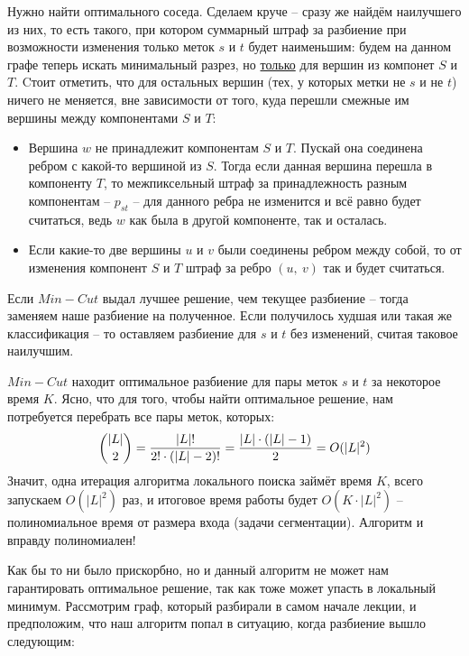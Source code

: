 \documentclass[a4paper,12pt]{article}
\begin{document}
Нужно найти оптимального соседа. Сделаем круче -- сразу же найдём наилучшего из них, то есть такого, при котором суммарный штраф за разбиение при возможности изменения только меток $s$ и $t$ будет наименьшим: будем на данном графе теперь искать минимальный разрез, но \underline{только} для вершин из компонет $S$ и $T$. Cтоит отметить, что для остальных вершин (тех, у которых метки не $s$ и не $t$) ничего не меняется, вне зависимости от того, куда перешли смежные им вершины между компонентами $S$ и $T$:
\begin{itemize}
    \item Вершина $w$ не принадлежит компонентам $S$ и $T$. Пускай она соединена ребром с какой-то вершиной из $S$. Тогда если данная вершина перешла в компоненту $T$, то межпиксельный штраф за принадлежность разным компонентам -- $p_{st}$ -- для данного ребра не изменится и всё равно будет считаться, ведь $w$ как была в другой компоненте, так и осталась.
    \item Если какие-то две вершины $u$ и $v$ были соединены ребром между собой, то от изменения компонент $S$ и $T$ штраф за ребро $(u,\ v)$ так и будет считаться.
\end{itemize}
Если $Min-Cut$ выдал лучшее решение, чем текущее разбиение -- тогда заменяем наше разбиение на полученное. Если получилось худшая или такая же классификация -- то оставляем разбиение для $s$ и $t$ без изменений, считая таковое наилучшим.

$Min-Cut$ находит оптимальное разбиение для пары меток $s$ и $t$ за некоторое время $K$. Ясно, что для того, чтобы найти оптимальное решение, нам потребуется перебрать все пары меток, которых:
\[\dbinom {|L|}{2} = \frac{|L|!}{2!\cdot (|L|-2)!} = \frac{|L| \cdot (|L| - 1)}{2} = O(|L|^2)\]
Значит, одна итерация алгоритма локального поиска займёт время $K$, всего запускаем $O(|L|^2)$ раз, и итоговое время работы будет $O(K \cdot |L|^2)$ -- полиномиальное время от размера входа (задачи сегментации). Алгоритм и вправду полиномиален!

Как бы то ни было прискорбно, но и данный алгоритм не может нам гарантировать оптимальное решение, так как тоже может упасть в локальный минимум. Рассмотрим граф, который разбирали в самом начале лекции, и предположим, что наш алгоритм попал в ситуацию, когда разбиение вышло следующим:
\end{document}
